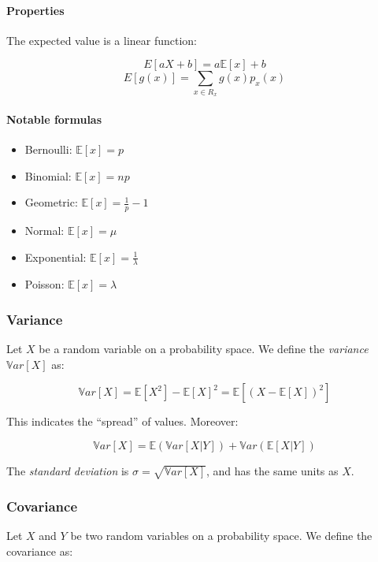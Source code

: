 \documentclass{article}
\begin{document}
\paragraph{Properties}\label{properties}

The expected value is a linear function:

\[E[aX+b] = a\mathbb{E}[x]+b\] \[E[g(x)]=\sum_{x\in R_x} g(x)p_x(x)\]

\paragraph{Notable formulas}\label{notable-formulas}

\begin{itemize}
\tightlist
\item
  Bernoulli: \(\mathbb{E}[x]=p\)
\item
  Binomial: \(\mathbb{E}[x]=np\)
\item
  Geometric: \(\mathbb{E}[x]= \frac{1}{p}-1\)
\item
  Normal: \(\mathbb{E}[x]=\mu\)
\item
  Exponential: \(\mathbb{E}[x]=\frac{1}{\lambda}\)
\item
  Poisson: \(\mathbb{E}[x]=\lambda\)
\end{itemize}

\subsubsection{Variance}\label{variance}

Let \(X\) be a random variable on a probability space. We define the
\emph{variance} \(\mathbb{V}ar[X]\) as:

\[\mathbb{V}ar[X]=\mathbb{E}[X^2]-\mathbb{E}[X]^2 = \mathbb{E}[(X-\mathbb{E}[X])^2]\]

This indicates the ``spread'' of values. Moreover:

\[\mathbb{V}ar[X]=\mathbb{E}(\mathbb{V}ar[X|Y]) + \mathbb{V}ar(\mathbb{E}[X|Y])\]

The \emph{standard deviation} is \(\sigma = \sqrt{\mathbb{V}ar[X]}\),
and has the same units as \(X\).

\subsubsection{Covariance}\label{covariance}

Let \(X\) and \(Y\) be two random variables on a probability space. We
define the covariance as:
\end{document}
